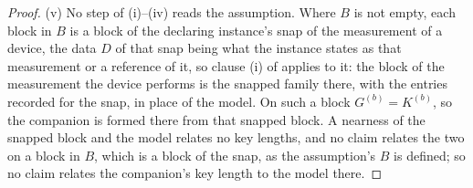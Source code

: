 \begin{proof}
(v) No step of (i)--(iv) reads the assumption. Where $B$ is not empty, each
block in $B$ is a block of the declaring instance's snap of the measurement
of a device, the data $D$ of that snap being what the instance states as
that measurement or a reference of it, so clause (i) of
 applies to it: the block of the
measurement the device performs is the snapped family there, with the
entries recorded for the snap, in place of the model. On such a block
$G^{(b)}=K^{(b)}$, so the companion is formed there from that snapped block.
A nearness of the snapped block and the model relates no key lengths, and
no claim relates the two on a block in $B$, which is a  block of
the snap, as the assumption's $B$ is defined; so no claim relates the
companion's key length to the model there.


\end{proof}
